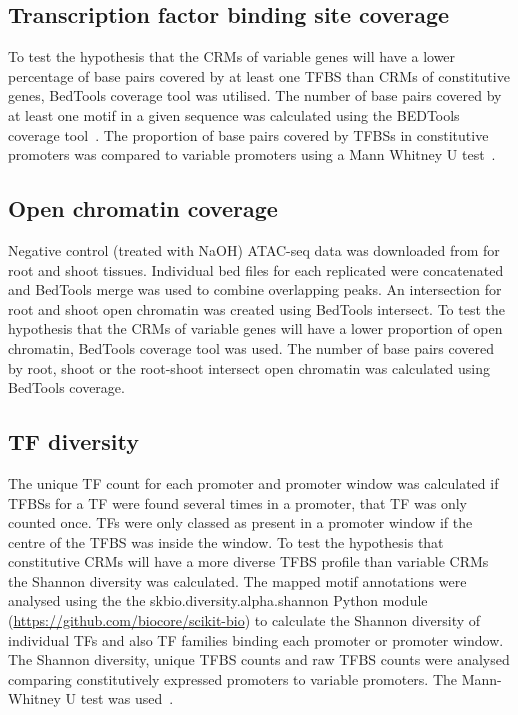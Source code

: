 \documentclass[../main.tex]{subfiles}
\begin{document}
\subsection{Transcription factor binding site coverage}
{\label{chapter1:methods:transcription-factor-binding-site-coverage}}

To test the hypothesis that the CRMs of variable genes will have a lower percentage of base pairs covered by at least one TFBS than CRMs of constitutive genes, BedTools coverage tool was utilised.
The number of base pairs covered by at least one motif in a given sequence was calculated using the BEDTools coverage tool~\autocite{quinlanBEDToolsFlexibleSuite2010}.
The proportion of base pairs covered by TFBSs in constitutive promoters was compared to variable promoters using a Mann Whitney U test~\autocite{mannTestWhetherOne1947}.

\subsection{Open chromatin coverage}
{\label{chapter1:methods:open-chromatin-coverage}}

Negative control (treated with NaOH) ATAC\hyp{}seq data was downloaded from \textcite{potterCytokininModulatesContextdependent2018} for root and shoot tissues.
Individual bed files for each replicated were concatenated and BedTools merge was used to combine overlapping peaks.
An intersection for root and shoot open chromatin was created using BedTools intersect.
To test the hypothesis that the CRMs of variable genes will have a lower proportion of open chromatin, BedTools coverage tool was used.
The number of base pairs covered by root, shoot or the root\hyp{}shoot intersect open chromatin was calculated using BedTools coverage.


\subsection{TF diversity}
{\label{chapter1:methods:tf-diversity}}

The unique TF count for each promoter and promoter window was calculated \ie{} if TFBSs for a TF were found several times in a promoter, that TF was only counted once.
TFs were only classed as present in a promoter window if the centre of the TFBS was inside the window.
To test the hypothesis that constitutive CRMs will have a more diverse TFBS profile than variable CRMs the Shannon diversity was calculated.
The mapped motif annotations were analysed using the the skbio.diversity.alpha.shannon Python module (\url{https://github.com/biocore/scikit-bio}) to calculate the Shannon diversity of individual TFs and also TF families binding each promoter or promoter window.
The Shannon diversity, unique TFBS counts and raw TFBS counts were analysed comparing constitutively expressed promoters to variable promoters.
The Mann\hyp{}Whitney U test was used~\autocite{mannTestWhetherOne1947}.
\end{document}
